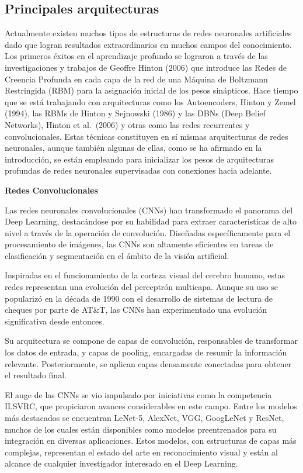 \documentclass[
  a4paper,
  DIV=11,
  numbers=noendperiod]{scrreprt}
\begin{document}
\subsection{Principales arquitecturas}\label{principales-arquitecturas}

Actualmente existen muchos tipos de estructuras de redes neuronales
artificiales dado que logran resultados extraordinarios en muchos campos
del conocimiento. Los primeros éxitos en el aprendizaje profundo se
lograron a través de las investigaciones y trabajos de Geoffre Hinton
(2006) que introduce las Redes de Creencia Profunda en cada capa de la
red de una Máquina de Boltzmann Restringida (RBM) para la asignación
inicial de los pesos sinápticos. Hace tiempo que se está trabajando con
arquitecturas como los Autoencoders, Hinton y Zemel (1994), las RBMs de
Hinton y Sejnowski (1986) y las DBNs (Deep Belief Networks), Hinton et
al.~(2006) y otras como las redes recurrentes y convolucionales. Estas
técnicas constituyen en sí mismas arquitecturas de redes neuronales,
aunque también algunas de ellas, como se ha afirmado en la introducción,
se están empleando para inicializar los pesos de arquitecturas profundas
de redes neuronales supervisadas con conexiones hacia adelante.

\textbf{Redes Convolucionales}

Las redes neuronales convolucionales (CNNs) han transformado el panorama
del Deep Learning, destacándose por su habilidad para extraer
características de alto nivel a través de la operación de convolución.
Diseñadas específicamente para el procesamiento de imágenes, las CNNs
son altamente eficientes en tareas de clasificación y segmentación en el
ámbito de la visión artificial.

Inspiradas en el funcionamiento de la corteza visual del cerebro humano,
estas redes representan una evolución del perceptrón multicapa. Aunque
su uso se popularizó en la década de 1990 con el desarrollo de sistemas
de lectura de cheques por parte de AT\&T, las CNNs han experimentado una
evolución significativa desde entonces.

Su arquitectura se compone de capas de convolución, responsables de
transformar los datos de entrada, y capas de pooling, encargadas de
resumir la información relevante. Posteriormente, se aplican capas
densamente conectadas para obtener el resultado final.

El auge de las CNNs se vio impulsado por iniciativas como la competencia
ILSVRC, que propiciaron avances considerables en este campo. Entre los
modelos más destacados se encuentran LeNet-5, AlexNet, VGG, GoogLeNet y
ResNet, muchos de los cuales están disponibles como modelos
preentrenados para su integración en diversas aplicaciones. Estos
modelos, con estructuras de capas más complejas, representan el estado
del arte en reconocimiento visual y están al alcance de cualquier
investigador interesado en el Deep Learning.
\end{document}
